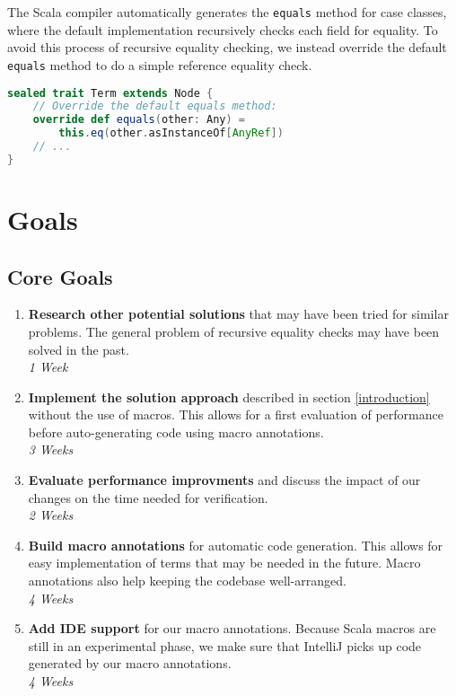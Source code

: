 \documentclass{article}
\begin{document}
The Scala compiler automatically generates the \texttt{equals} method for case classes,
where the default implementation recursively checks each field for equality. To avoid
this process of recursive equality checking, we instead override the default \texttt{equals}
method to do a simple reference equality check.

    \begin{lstlisting}[language=Scala, caption=We override the the default equals method to do a simple reference equality check.]
sealed trait Term extends Node {
    // Override the default equals method:
    override def equals(other: Any) =
        this.eq(other.asInstanceOf[AnyRef]) 
    // ...
}
    \end{lstlisting}

    \section{Goals}
    \subsection{Core Goals}
    \begin{enumerate}
        \item \textbf{Research other potential solutions} that may have been
        tried for similar problems. The general problem of recursive equality
        checks may have been solved in the past.
        \\\textit{1 Week}
        \item \textbf{Implement the solution approach} described in section
        \ref{introduction} without the use of macros. This allows for a first
        evaluation of performance before auto-generating code using macro
        annotations.
        \\\textit{3 Weeks}
        \item \textbf{Evaluate performance improvments} and discuss
        the impact of our changes on the time needed for verification.
        \\\textit{2 Weeks}
        \item \textbf{Build macro annotations} for automatic code generation.
        This allows for easy implementation of terms that may be needed in the
        future. Macro annotations also help keeping the codebase well-arranged. 
        \\\textit{4 Weeks}
        \item \textbf{Add IDE support} for our macro annotations. Because
        Scala macros are still in an experimental phase, we make sure that
        IntelliJ picks up code generated by our macro annotations.
        \\\textit{4 Weeks}
    \end{enumerate}
\end{document}
